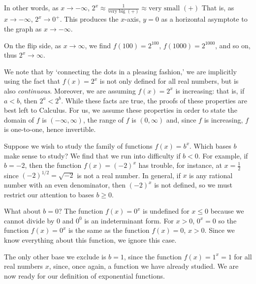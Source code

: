 \smallskip

In other words, as $x \rightarrow -\infty$, $2^{x} \approx \frac{1}{\text{very big $(+)$}}  \approx \text{very small $(+)$}$   That is, as $x \rightarrow -\infty$, $2^{x} \rightarrow 0^{+}$.  This produces the $x$-axis, $y = 0$ as a horizontal asymptote to the graph as $x \rightarrow -\infty$. 

\smallskip

On the flip side, as $x \rightarrow \infty$, we find $f(100) = 2^{100}$, $f(1000) = 2^{1000}$, and so on, thus $2^{x} \rightarrow \infty$.  

\smallskip

We note that by  `connecting the dots in a pleasing fashion,' we are implicitly using the fact that $f(x) = 2^{x}$ is not only defined for all real numbers,  but  is also \textit{continuous}.   Moreover, we are assuming $f(x) = 2^{x}$ is increasing:  that is, if $a<b$, then $2^{a} < 2^{b}$. While these facts are true, the proofs of these properties are best left to Calculus. For us, we assume these properties in order to state the domain of $f$ is $(-\infty, \infty)$, the range of $f$ is $(0, \infty)$ and,  since $f$ is increasing, $f$ is one-to-one, hence invertible.
 
    
\smallskip

Suppose we wish to study the family of functions $f(x) = b^{x}$.  Which bases $b$ make sense to study?  We find that we run into difficulty if $b < 0$.  For example, if $b = -2$, then the function $f(x) = (-2)^{x}$ has trouble, for instance, at $x = \frac{1}{2}$ since $(-2)^{1/2} = \sqrt{-2}$ is not a real number. In general, if $x$ is any rational number with an even denominator, then $(-2)^{x}$ is not defined, so we must restrict our attention to bases $b \geq 0$.  

\smallskip

What about $b = 0$?  The function $f(x) = 0^{x}$ is undefined for $x \leq 0$ because we cannot divide by $0$ and $0^{0}$ is an indeterminant form.  For $x > 0$, $0^{x} = 0$ so the function  $f(x) = 0^{x}$ is the same as the function $f(x) = 0$, $x > 0$. \label{indeterminantformtwo}  Since we know everything about this function, we ignore this case.
\smallskip

The only other base we exclude is $b=1$, since the function $f(x) = 1^{x} = 1$ for all real numbers $x$, since, once again, a function we have already studied.  We are now ready for our definition of exponential functions.

